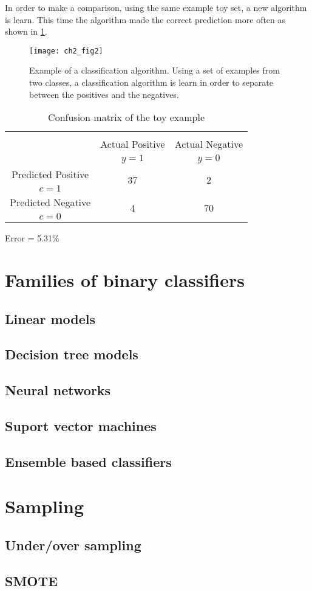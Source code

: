 	In order to make a comparison, using the same example toy set, a new algorithm is learn. This 
time the algorithm made the correct prediction more often as shown in \figurename{ \ref{fig:ch2:2}}.

\begin{figure}[t!]
	\centering
	\texttt{[image: ch2\_fig2]}
	\caption{Example of a classification algorithm. Using a set of examples from two classes, a 
	classification algorithm is learn in order to separate between the positives and the negatives. }
	\label{fig:ch2:2}
\end{figure}

    	\begin{table}[!t]
		\centering
		\footnotesize
    \begin{tabular}{c|c|c}
      \multicolumn{3}{c}{}\\
			\multicolumn{1}{c|}{}  & Actual Positive& Actual Negative \\
			\multicolumn{1}{c|}{} & $y=1$& $y=0$ \\
			\hline
			Predicted Positive 		& \multirow{ 2}{*}{37} & \multirow{ 
			2}{*}{2} \\
			$c=1$ & &\\
			\hline
			Predicted Negative  	& \multirow{ 2}{*}{4} & \multirow{ 
			2}{*}{70} \\
			$c=0$ & &\\
		\end{tabular}
		\caption{Confusion matrix of the toy example}
		\label{tab:ch2:2}
  \end{table}  
  Error = 5.31\%
  
\section{Families of binary classifiers}
\subsection{Linear models}
\subsection{Decision tree models}
\subsection{Neural networks}
\subsection{Suport vector machines}
\subsection{Ensemble based classifiers}
\section{Sampling}
\subsection{Under/over sampling}
\subsection{SMOTE}